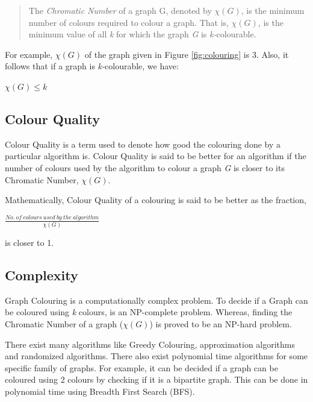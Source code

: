 \documentclass[MTech]{iitmdiss}
\begin{document}
\begin{verse}
The \textit{Chromatic Number} of a graph G, denoted by $ \chi(G) $, is the minimum number of colours required to colour a graph. That is, $ \chi(G) $, is the minimum value of all \textit{k} for which the graph \textit{G} is \textit{k-}colourable. 
\end{verse}

For example, $\chi(G)$ of the graph given in Figure \ref{fig:colouring} is 3. Also, it follows that if a graph is \textit{k-}colourable, we have:
\begin{center}
$ \chi(G) \leq k $
\end{center}
\subsection{Colour Quality}
Colour Quality is a term used to denote how good the colouring done by a particular algorithm is. Colour Quality is said to be better for an algorithm if the number of colours used by the algorithm to colour a graph \textit{G} is closer to its Chromatic Number, $\chi(G)$.

Mathematically, Colour Quality of a colouring is said to be better as the fraction,
\begin{center}
$\frac{No. \: of \: colours \: used \: by \: the \: algorithm}{\chi(G)} $
\end{center}
is closer to 1.
\subsection{Complexity}
Graph Colouring is a computationally complex problem. To decide if a Graph can be coloured using \textit{k} colours, is an NP-complete problem. Whereas, finding the Chromatic Number of a graph ($ \chi(G) $) is proved to be an NP-hard problem.

There exist many algorithms like Greedy Colouring, approximation algorithms and randomized algorithms. There also exist polynomial time algorithms for some specific family of graphs. For example, it can be decided if a graph can be coloured using 2 colours by checking if it is a bipartite graph. This can be done in polynomial time using Breadth First Search (BFS).
\end{document}

